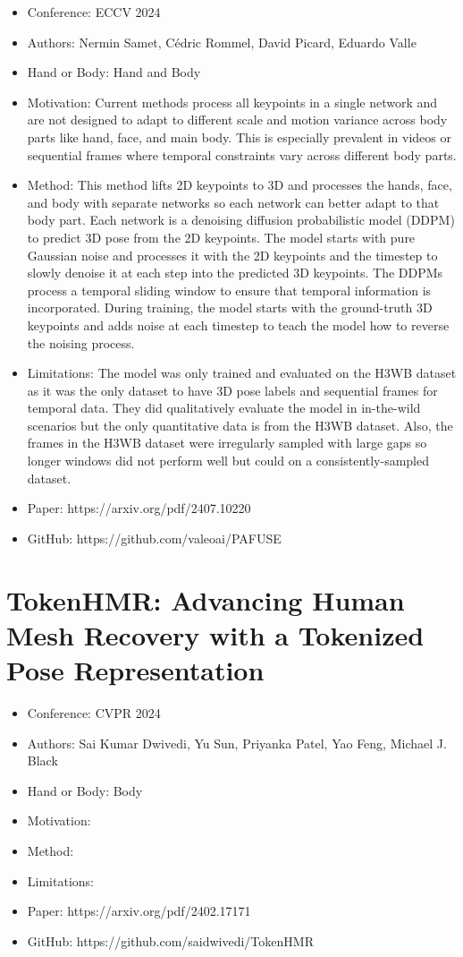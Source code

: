 \documentclass{article}
\begin{document}
\begin{itemize}
    \item Conference: ECCV 2024
    \item Authors: Nermin Samet, Cédric Rommel, David Picard, Eduardo Valle
    \item Hand or Body: Hand and Body
    \item Motivation: Current methods process all keypoints in a single network and are not designed to adapt to different scale and motion variance across body parts like hand, face, and main body. This is especially prevalent in videos or sequential frames where temporal constraints vary across different body parts.
    \item Method: This method lifts 2D keypoints to 3D and processes the hands, face, and body with separate networks so each network can better adapt to that body part. Each network is a denoising diffusion probabilistic model (DDPM) to predict 3D pose from the 2D keypoints. The model starts with pure Gaussian noise and processes it with the 2D keypoints and the timestep to slowly denoise it at each step into the predicted 3D keypoints. The DDPMs process a temporal sliding window to ensure that temporal information is incorporated. During training, the model starts with the ground-truth 3D keypoints and adds noise at each timestep to teach the model how to reverse the noising process.
    \item Limitations: The model was only trained and evaluated on the H3WB dataset as it was the only dataset to have 3D pose labels and sequential frames for temporal data. They did qualitatively evaluate the model in in-the-wild scenarios but the only quantitative data is from the H3WB dataset. Also, the frames in the H3WB dataset were irregularly sampled with large gaps so longer windows did not perform well but could on a consistently-sampled dataset.
    \item Paper: https://arxiv.org/pdf/2407.10220
    \item GitHub: https://github.com/valeoai/PAFUSE
\end{itemize}

\section*{TokenHMR: Advancing Human Mesh Recovery with a Tokenized Pose Representation}

\begin{itemize}
    \item Conference: CVPR 2024
    \item Authors: Sai Kumar Dwivedi, Yu Sun, Priyanka Patel, Yao Feng, Michael J. Black
    \item Hand or Body: Body
    \item Motivation: 
    \item Method:
    \item Limitations:
    \item Paper: https://arxiv.org/pdf/2402.17171
    \item GitHub: https://github.com/saidwivedi/TokenHMR
\end{itemize}
\end{document}
